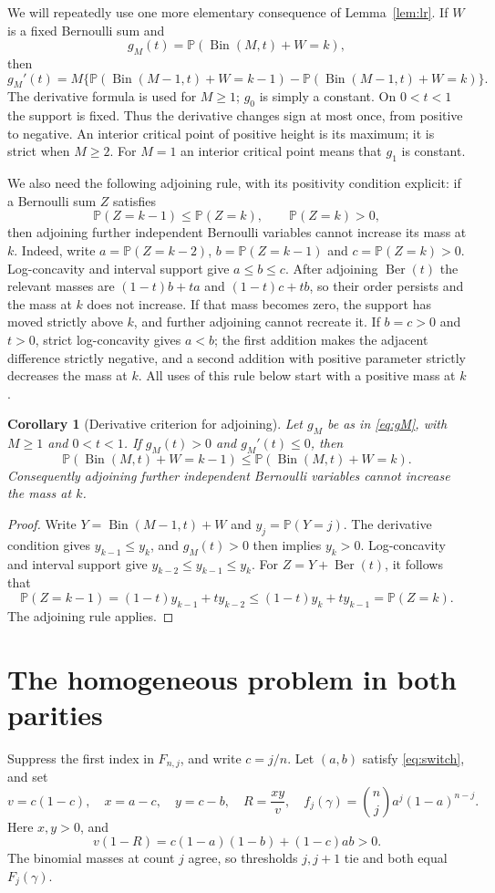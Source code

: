 \documentclass[11pt]{article}
\numberwithin{equation}{section}
\newtheorem{corollary}[theorem]{Corollary}
\theoremstyle{remark}\newtheorem{remark}[theorem]{Remark}
\DeclareMathOperator{\Ber}{Ber}
\DeclareMathOperator{\Bin}{Bin}
\newcommand{\PP}{\mathbb P}
\begin{document}
We will repeatedly use one more elementary consequence of
Lemma~\ref{lem:lr}. If $W$ is a fixed Bernoulli sum and
\begin{equation}\label{eq:gM}
 g_M(t)=\PP(\Bin(M,t)+W=k),
\end{equation}
then
\[
 g_M'(t)=M\{\PP(\Bin(M-1,t)+W=k-1)
                 -\PP(\Bin(M-1,t)+W=k)\}.
\]
The derivative formula is used for $M\ge1$; $g_0$ is simply a
constant. On $0<t<1$ the support is fixed. Thus the derivative changes
sign at most once, from positive to negative. An interior critical point
of positive height is its maximum; it is strict when $M\ge2$. For
$M=1$ an interior critical point means that $g_1$ is constant.

We also need the following adjoining rule, with its positivity condition
explicit: if a Bernoulli sum $Z$ satisfies
\[
 \PP(Z=k-1)\le\PP(Z=k),\qquad \PP(Z=k)>0,
\]
then adjoining further independent Bernoulli variables cannot increase
its mass at $k$. Indeed, write $a=\PP(Z=k-2)$, $b=\PP(Z=k-1)$ and
$c=\PP(Z=k)>0$. Log-concavity and interval support give
$a\le b\le c$. After adjoining $\Ber(t)$ the relevant masses are
$(1-t)b+ta$ and $(1-t)c+tb$, so their order persists and the mass at
$k$ does not increase. If that mass becomes zero, the support has moved
strictly above $k$, and further adjoining cannot recreate it.
If $b=c>0$ and $t>0$, strict log-concavity gives $a<b$; the first
addition makes the adjacent difference strictly negative, and a second
addition with positive parameter strictly decreases the mass at $k$.
All uses of this rule below start with a positive mass at $k$.

\begin{corollary}[Derivative criterion for adjoining]\label{cor:adjoining}
Let $g_M$ be as in \eqref{eq:gM}, with $M\ge1$ and $0<t<1$.
If $g_M(t)>0$ and $g_M'(t)\le0$, then
\[
 \PP(\Bin(M,t)+W=k-1)\le\PP(\Bin(M,t)+W=k).
\]
Consequently adjoining further independent Bernoulli variables cannot
increase the mass at $k$.
\end{corollary}
\begin{proof}
Write $Y=\Bin(M-1,t)+W$ and $y_j=\PP(Y=j)$. The derivative condition
gives $y_{k-1}\le y_k$, and $g_M(t)>0$ then implies $y_k>0$.
Log-concavity and interval support give $y_{k-2}\le y_{k-1}\le y_k$.
For $Z=Y+\Ber(t)$, it follows that
\[
 \PP(Z=k-1)=(1-t)y_{k-1}+ty_{k-2}
 \le(1-t)y_k+ty_{k-1}=\PP(Z=k).
\]
The adjoining rule applies.
\end{proof}

\section{The homogeneous problem in both parities}
Suppress the first index in $F_{n,j}$, and write $c=j/n$.
Let $(a,b)$ satisfy \eqref{eq:switch}, and set
\[
 v=c(1-c),\quad x=a-c,\quad y=c-b,\quad
 R=\frac{xy}{v},\quad f_j(\gamma)=\binom nj a^j(1-a)^{n-j}.
\]
Here $x,y>0$, and
\begin{equation}\label{eq:Rden}
 v(1-R)=c(1-a)(1-b)+(1-c)ab>0.
\end{equation}
The binomial masses at count $j$ agree, so thresholds $j,j+1$ tie and
both equal $F_j(\gamma)$.
\end{document}
